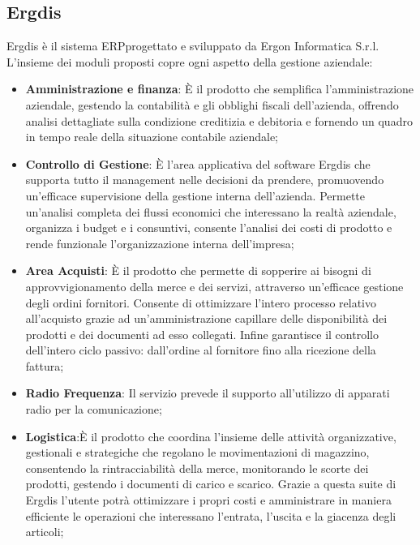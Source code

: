 \subsection{Ergdis}

Ergdis è il sistema ERP\glosp progettato e sviluppato da Ergon Informatica S.r.l. \newline
L'insieme dei moduli proposti copre ogni aspetto della gestione aziendale:

\begin{itemize}
	\item \textbf{Amministrazione e finanza}: È il prodotto che semplifica l’amministrazione aziendale, gestendo la contabilità e gli obblighi fiscali dell’azienda, offrendo analisi dettagliate sulla condizione creditizia e debitoria e fornendo un quadro in tempo reale della situazione contabile aziendale;
	
	\item \textbf{Controllo di Gestione}: È l’area applicativa del software Ergdis che supporta tutto il management nelle decisioni da prendere, promuovendo un’efficace supervisione della gestione interna dell’azienda. Permette un’analisi completa dei flussi economici che interessano la realtà aziendale, organizza i budget e i consuntivi, consente l’analisi dei costi di prodotto e rende funzionale l’organizzazione interna dell’impresa;
	
	\item \textbf{Area Acquisti}: È il prodotto che permette di sopperire ai bisogni di approvvigionamento della merce e dei servizi, attraverso un’efficace gestione degli ordini fornitori. Consente di ottimizzare l'intero processo relativo all’acquisto grazie ad un’amministrazione capillare delle disponibilità dei prodotti e dei documenti ad esso collegati. Infine garantisce il controllo dell’intero ciclo passivo: dall’ordine al fornitore fino alla ricezione della fattura;
	
	\item \textbf{Radio Frequenza}: Il servizio prevede il supporto all'utilizzo di apparati radio per la comunicazione;
	
	\item \textbf{Logistica}:È il prodotto che coordina l’insieme delle attività organizzative, gestionali e strategiche che regolano le movimentazioni di magazzino, consentendo la rintracciabilità della merce, monitorando le scorte dei prodotti, gestendo i documenti di carico e scarico. Grazie a questa suite di Ergdis l’utente potrà ottimizzare i propri costi e amministrare in maniera efficiente le operazioni che interessano l’entrata, l’uscita e la giacenza degli articoli;
	

\end{itemize}
